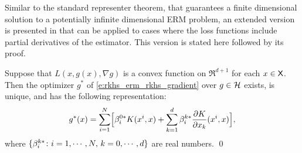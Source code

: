 Similar to the standard representer theorem, that guarantees a finite dimensional solution to a potentially infinite dimensional ERM problem, an extended version is presented in \cite{zho08} that can be applied to cases where the loss functions include partial derivatives of the estimator. This version is stated here followed by its proof. 
\begin{theorem}
	\label{theorem:ext_rep_theorem}
	Suppose that $L(x, g(x),\nabla g)$ is a convex function on $\Re^{d+1}$ for each $x\in{\sf X}$.
	Then the  optimizer $g^*$ of \eqref{e:rkhs_erm_rkhs_gradient} over $g\in{\cal H}$ exists, is unique, and has the following representation: 
	\begin{equation}
	g^*(x) = \sum_{i=1}^N  \Bigl[
	\rkhsparam_i^{0*}  K(x^i,x)   +  \sum_{k =1}^d  \rkhsparam_i^{k*} \frac{\partial K}{\partial x_k} (x^i, x) \Bigr],
	\label{e:rkhs_ext_rep_theorem}
	\end{equation}
	where $\{\beta_i^{k*} \colon i=1,\cdots,N,\, k = 0,\cdots,d\}$ are real numbers.
	\qed
\end{theorem}
